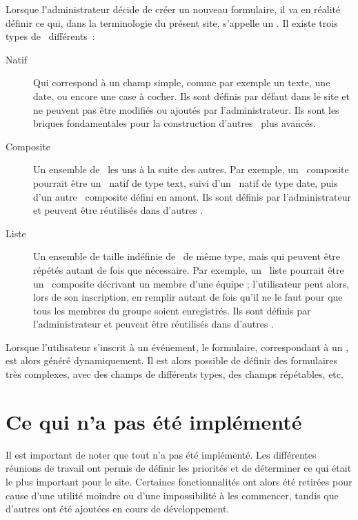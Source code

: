 Lorsque l'administrateur décide de créer un nouveau formulaire, il va en réalité définir ce qui, dans la terminologie du présent site, s'appelle un \formwidget. Il existe trois types de \formwidget\ différents~:
\begin{description}
    \item[Natif] Qui correspond à un champ simple, comme par exemple un texte, une date, ou encore une case à cocher. Ils sont définis par défaut dans le site et ne peuvent pas être modifiés ou ajoutés par l'administrateur. Ils sont les briques fondamentales pour la construction d'autres \formwidget\ plus avancés.
    \item[Composite] Un ensemble de \formwidget\ les uns à la suite des autres. Par exemple, un \formwidget\ composite pourrait être un \formwidget\ natif de type text, suivi d'un \formwidget\ natif de type date, puis d'un autre \formwidget\ composite défini en amont. Ils sont définis par l'administrateur et peuvent être réutilisés dans d'autres \formwidget.
    \item[Liste] Un ensemble de taille indéfinie de \formwidget\ de même type, mais qui peuvent être répétés autant de fois que nécessaire. Par exemple, un \formwidget\ liste pourrait être un \formwidget\ composite décrivant un membre d'une équipe ; l'utilisateur peut alors, lors de son inscription, en remplir autant de fois qu'il ne le faut pour que tous les membres du groupe soient enregistrés. Ils sont définis par l'administrateur et peuvent être réutilisés dans d'autres \formwidget.
\end{description}

Lorsque l'utilisateur s'inscrit à un événement, le formulaire, correspondant à un \formwidget, est alors généré dynamiquement. Il est alors possible de définir des formulaires très complexes, avec des champs de différents types, des champs répétables, etc.

\section{Ce qui n'a pas été implémenté}
\label{sec:non-implem}

Il est important de noter que tout n'a pas été implémenté. Les différentes réunions de travail ont permis de définir les priorités et de déterminer ce qui était le plus important pour le site. Certaines fonctionnalités ont alors été retirées pour cause d'une utilité moindre ou d'une impossibilité à les commencer, tandis que d'autres ont été ajoutées en cours de développement.
\bigskip


